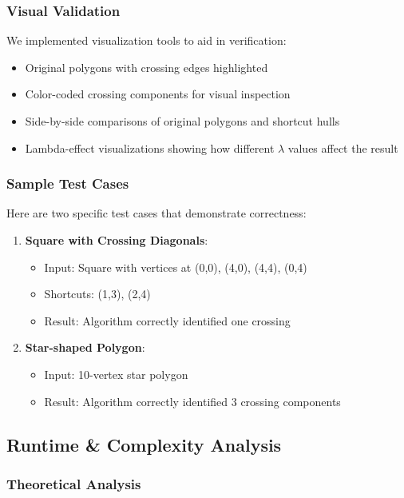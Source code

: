 \documentclass[11pt]{article}
\begin{document}
\subsubsection{Visual Validation}
We implemented visualization tools to aid in verification:

\begin{itemize}
    \item Original polygons with crossing edges highlighted
    \item Color-coded crossing components for visual inspection
    \item Side-by-side comparisons of original polygons and shortcut hulls
    \item Lambda-effect visualizations showing how different $\lambda$ values affect the result
\end{itemize}

\subsubsection{Sample Test Cases}
Here are two specific test cases that demonstrate correctness:

\begin{enumerate}
    \item \textbf{Square with Crossing Diagonals}:
    \begin{itemize}
        \item Input: Square with vertices at (0,0), (4,0), (4,4), (0,4)
        \item Shortcuts: (1,3), (2,4)
        \item Result: Algorithm correctly identified one crossing
    \end{itemize}
    
    \item \textbf{Star-shaped Polygon}:
    \begin{itemize}
        \item Input: 10-vertex star polygon
        \item Result: Algorithm correctly identified 3 crossing components
    \end{itemize}
\end{enumerate}

\subsection{Runtime \& Complexity Analysis}

\subsubsection{Theoretical Analysis}
\end{document}
